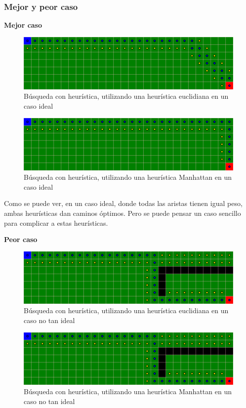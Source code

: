 \subsubsection{Mejor y peor caso}
\textbf{Mejor caso}
\begin{figure}[H]
\centering
\includegraphics[width=\textwidth]{BestSearch/grafo2Euclidean.png}
\caption{Búsqueda con heurística, utilizando una heurística euclidiana en un caso ideal}
\end{figure}
\begin{figure}[H]
\centering
\includegraphics[width=\textwidth]{BestSearch/grafo2Manhattan.png}
\caption{Búsqueda con heurística, utilizando una heurística Manhattan en un caso ideal}
\end{figure}

Como se puede ver, en un caso ideal, donde todas las aristas tienen igual peso, ambas heurísticas dan caminos óptimos. Pero se puede pensar un caso sencillo para complicar a estas heurísticas.

\textbf{Peor caso}
\begin{figure}[H]
\centering
\includegraphics[width=\textwidth]{BestSearch/grafo3Euclidean.png}
\caption{Búsqueda con heurística, utilizando una heurística euclidiana en un caso no tan ideal}
\end{figure}
\begin{figure}[H]
\centering
\includegraphics[width=\textwidth]{BestSearch/grafo3Manhattan.png}
\caption{Búsqueda con heurística, utilizando una heurística Manhattan en un caso no tan ideal}
\end{figure}

